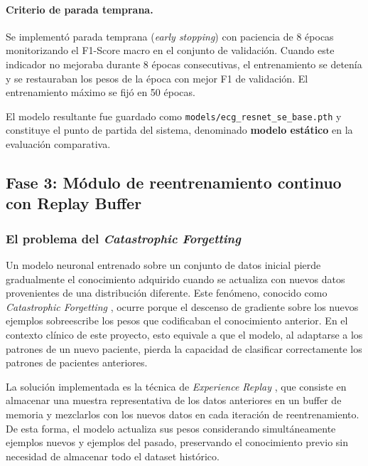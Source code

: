 \paragraph{Criterio de parada temprana.}
Se implementó parada temprana (\textit{early stopping}) con paciencia de 8 épocas monitorizando el F1-Score macro en el conjunto de validación. Cuando este indicador no mejoraba durante 8 épocas consecutivas, el entrenamiento se detenía y se restauraban los pesos de la época con mejor F1 de validación. El entrenamiento máximo se fijó en 50 épocas.

El modelo resultante fue guardado como \texttt{models/ecg\_resnet\_se\_base.pth} y constituye el punto de partida del sistema, denominado \textbf{modelo estático} en la evaluación comparativa.

\subsection{Fase 3: Módulo de reentrenamiento continuo con Replay Buffer}

\subsubsection{El problema del \textit{Catastrophic Forgetting}}

Un modelo neuronal entrenado sobre un conjunto de datos inicial pierde gradualmente el conocimiento adquirido cuando se actualiza con nuevos datos provenientes de una distribución diferente. Este fenómeno, conocido como \textit{Catastrophic Forgetting} \cite{McCloskey1989}, ocurre porque el descenso de gradiente sobre los nuevos ejemplos sobreescribe los pesos que codificaban el conocimiento anterior. En el contexto clínico de este proyecto, esto equivale a que el modelo, al adaptarse a los patrones de un nuevo paciente, pierda la capacidad de clasificar correctamente los patrones de pacientes anteriores.

La solución implementada es la técnica de \textit{Experience Replay} \cite{Ratcliff1990}, que consiste en almacenar una muestra representativa de los datos anteriores en un buffer de memoria y mezclarlos con los nuevos datos en cada iteración de reentrenamiento. De esta forma, el modelo actualiza sus pesos considerando simultáneamente ejemplos nuevos y ejemplos del pasado, preservando el conocimiento previo sin necesidad de almacenar todo el dataset histórico.

